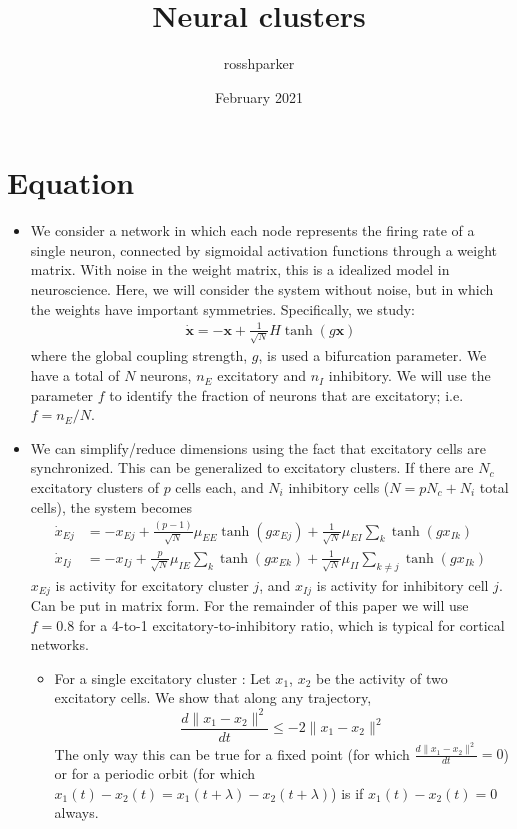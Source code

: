 \documentclass[11pt,reqno]{amsart}
\title{Neural clusters}
\author{rosshparker }
\date{February 2021}
\newcommand{\xvec}{\mathbf{x}}
\begin{document}
\setcounter{tocdepth}{3}
\tableofcontents


\section{Equation}

\begin{itemize}
\item We consider a network in which each node represents the firing rate of a single neuron, connected by sigmoidal activation functions through a weight matrix. With noise in the weight matrix, this is a idealized model in neuroscience. Here, we will consider the system without noise, but in which the weights have important symmetries. Specifically, we study:
\begin{eqnarray}
\dot{\xvec} = -\xvec + \frac{1}{\sqrt{N}} H \tanh(g \xvec) \label{eqn:sys_Basic}
\end{eqnarray}
where the global coupling strength, $g$, is used a bifurcation parameter. We have a total of $N$ neurons, $n_E$ excitatory and $n_I$ inhibitory. We will use the parameter $f$ to identify the fraction of neurons that are excitatory; i.e. $f = n_E/N$. 

\item We can simplify/reduce dimensions using the fact that excitatory cells are synchronized. This can be generalized to excitatory clusters. If there are $N_c$ excitatory clusters of $p$ cells each, and $N_i$ inhibitory cells ($N = pN_c + N_i$ total cells), the system becomes
\begin{equation}\label{eq:reducedsystem}
\begin{aligned}
\dot{x}_{Ej} &= -x_{Ej} + \frac{(p-1)}{\sqrt{N}}\mu_{EE} \tanh(g x_{Ej}) + \frac{1}{\sqrt{N}} \mu_{EI} \sum_k \tanh(g x_{Ik}) \\
\dot{x}_{Ij} &= -x_{Ij} + \frac{p}{\sqrt{N}}\mu_{IE} \sum_k \tanh(g x_{Ek}) + \frac{1}{\sqrt{N}} \mu_{II} \sum_{k\neq j}  \tanh(g x_{Ik}) 
\end{aligned}
\end{equation}
$x_{Ej}$ is activity for excitatory cluster $j$, and $x_{Ij}$ is activity for inhibitory cell $j$. Can be put in matrix form. For the remainder of this paper we will use $f = 0.8$ for a 4-to-1 excitatory-to-inhibitory ratio, which is typical for cortical networks.
\begin{itemize}
    \item For a single excitatory cluster \cite{Barreiro2017}: Let $x_1$, $x_2$ be the activity of two excitatory cells. We show that along any trajectory, $$\frac{d\parallel x_1 - x_2 \parallel^2}{dt} \leq  -2 \parallel x_1 - x_2 \parallel^2$$
    The only way this can be true for a fixed point (for which $\frac{d\parallel x_1 - x_2 \parallel^2}{dt}=0$) or for a periodic orbit (for which $x_1(t)-x_2(t) = x_1(t+\lambda)-x_2(t+\lambda)$) is if $x_1(t)-x_2(t) = 0$ always.


\end{itemize}
\end{itemize}
\end{document}
